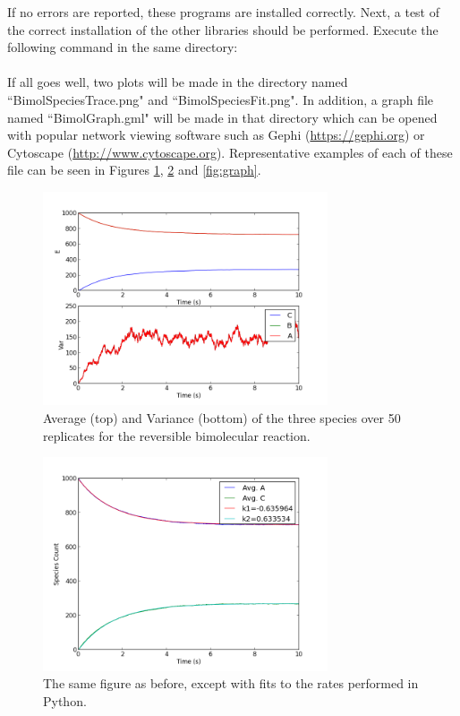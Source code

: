 \noindent If no errors are reported, these programs are installed correctly.  Next, a test of the correct installation of the other libraries should be performed.  Execute the following command in the same directory: \\

 \\

\noindent If all goes well, two plots will be made in the directory named ``BimolSpeciesTrace.png" and ``BimolSpeciesFit.png".  In addition, a graph file named ``BimolGraph.gml" will be made in that directory which can be opened with popular network viewing software such as Gephi (\url{https://gephi.org}) or Cytoscape (\url{http://www.cytoscape.org}). Representative examples of each of these file can be seen in Figures \ref{fig:bst}, \ref{fig:bsf} and \ref{fig:graph}.


\begin{figure}[h!]
  \centering
      \includegraphics[width=0.75\textwidth]{Figures/BimolSpeciesTrace.png}
  \caption{Average (top) and Variance (bottom) of  the three species over 50 replicates for the reversible bimolecular reaction.} \label{fig:bst}
\end{figure}

\begin{figure}[h!]
  \centering
      \includegraphics[width=0.75\textwidth]{Figures/BimolSpeciesFit.png}
  \caption{The same figure as before, except with fits to the rates performed in Python.} \label{fig:bsf}
\end{figure}

